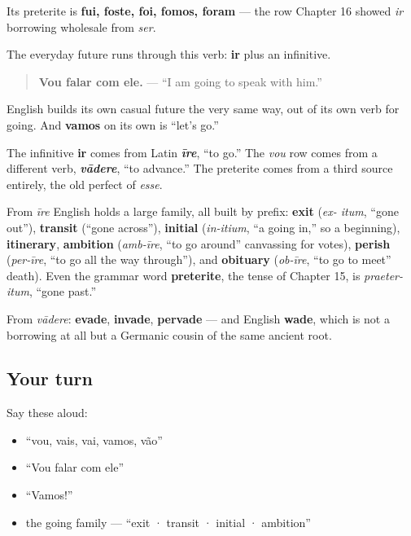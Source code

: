 Its preterite is \textbf{fui, foste, foi, fomos, foram} — the row Chapter 16 showed \emph{ir} borrowing wholesale from \emph{ser}.

The everyday future runs through this verb: \textbf{ir} plus an infinitive.

\begin{quote}
\textbf{Vou falar com ele.} — \textquotedblleft{}I am going to speak with him.\textquotedblright{}
\end{quote}

English builds its own casual future the very same way, out of its own verb for going. And \textbf{vamos} on its own is \textquotedblleft{}let's go.\textquotedblright{}

\begin{cousinweb}
The infinitive \textbf{ir} comes from Latin \emph{\textbf{īre}}, \textquotedblleft{}to go.\textquotedblright{} The \emph{vou} row comes from a different verb, \emph{\textbf{vādere}}, \textquotedblleft{}to advance.\textquotedblright{} The preterite comes from a third source entirely, the old perfect of \emph{esse}.

From \emph{īre} English holds a large family, all built by prefix: \textbf{exit} (\emph{ex- itum}, \textquotedblleft{}gone out\textquotedblright{}), \textbf{transit} (\textquotedblleft{}gone across\textquotedblright{}), \textbf{initial} (\emph{in-itium}, \textquotedblleft{}a going in,\textquotedblright{} so a beginning), \textbf{itinerary}, \textbf{ambition} (\emph{amb-īre}, \textquotedblleft{}to go around\textquotedblright{} canvassing for votes), \textbf{perish} (\emph{per-īre}, \textquotedblleft{}to go all the way through\textquotedblright{}), and \textbf{obituary} (\emph{ob-īre}, \textquotedblleft{}to go to meet\textquotedblright{} death). Even the grammar word \textbf{preterite}, the tense of Chapter 15, is \emph{praeter-itum}, \textquotedblleft{}gone past.\textquotedblright{}

From \emph{vādere}: \textbf{evade}, \textbf{invade}, \textbf{pervade} — and English \textbf{wade}, which is not a borrowing at all but a Germanic cousin of the same ancient root.
\end{cousinweb}

\subsection*{Your turn}
Say these aloud:

\begin{itemize}
\raggedright
  \item \textquotedblleft{}vou, vais, vai, vamos, vão\textquotedblright{}
  \item \textquotedblleft{}Vou falar com ele\textquotedblright{}
  \item \textquotedblleft{}Vamos!\textquotedblright{}
  \item the going family — \textquotedblleft{}exit · transit · initial · ambition\textquotedblright{}
\end{itemize}

